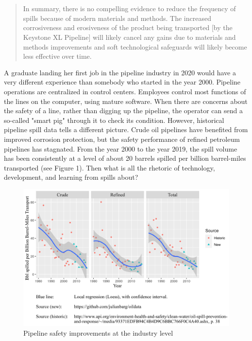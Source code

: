 \section{}

\begin{quote}
	In summary, there is no compelling evidence to reduce the frequency of spills because of modern materials and methods. The increased corrosiveness and erosiveness of the product being transported [by the Keystone XL Pipeline] will likely cancel any gains due to materials and methods improvements and soft technological safeguards will likely become less effective over time. \citep{Stansbury2011}
\end{quote}

A graduate landing her first job in the pipeline industry in 2020 would have a very different experience than somebody who started in the year 2000. Pipeline operations are centralized in control centers. Employees control most functions of the lines on the computer, using mature software. When there are concerns about the safety of a line, rather than digging up the pipeline, the operator can send a so-called "smart pig" through it to check its condition. However, historical pipeline spill data tells a different picture. Crude oil pipelines have benefited from improved corrosion protection, but the safety performance of refined petroleum pipelines has stagnated. From the year 2000 to the year 2019, the spill volume has been consistently at a level of about 20 barrels spilled per billion barrel-miles transported (see Figure 1). Then what is all the rhetoric of technology, development, and learning from spills about?

\begin{figure}
	\caption{Pipeline safety improvements at the industry level}
	\centerline{\includegraphics{../illustrations/population_learning_4.png}}
\end{figure}

